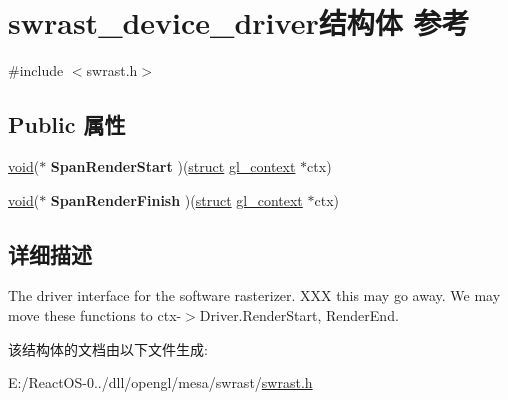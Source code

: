 \hypertarget{structswrast__device__driver}{}\section{swrast\+\_\+device\+\_\+driver结构体 参考}
\label{structswrast__device__driver}


{\ttfamily \#include $<$swrast.\+h$>$}

\subsection*{Public 属性}
\begin{DoxyCompactItemize}
\item 
\mbox{\label{structswrast__device__driver_a9304e3dbf9c47b18b2b02d7c9d63462c}} 
\hyperlink{interfacevoid}{void}($\ast$ {\bfseries Span\+Render\+Start} )(\hyperlink{interfacestruct}{struct} \hyperlink{structgl__context}{gl\+\_\+context} $\ast$ctx)
\item 
\mbox{\label{structswrast__device__driver_a4ed263bcf0cf4ded519df6dfcea828e5}} 
\hyperlink{interfacevoid}{void}($\ast$ {\bfseries Span\+Render\+Finish} )(\hyperlink{interfacestruct}{struct} \hyperlink{structgl__context}{gl\+\_\+context} $\ast$ctx)
\end{DoxyCompactItemize}


\subsection{详细描述}
The driver interface for the software rasterizer. X\+XX this may go away. We may move these functions to ctx-\/$>$Driver.\+Render\+Start, Render\+End. 

该结构体的文档由以下文件生成\+:\begin{DoxyCompactItemize}
\item 
E\+:/\+React\+O\+S-\/0../dll/opengl/mesa/swrast/\hyperlink{swrast_8h}{swrast.\+h}\end{DoxyCompactItemize}
